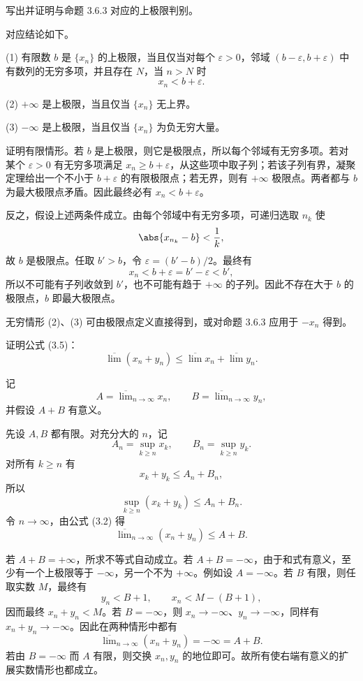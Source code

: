 \begin{xexercise}[3.6.4 练习题 9]
写出并证明与命题 3.6.3 对应的上极限判别。
\end{xexercise}
\begin{xsolution}
对应结论如下。

(1) 有限数 $b$ 是 $\{x_n\}$ 的上极限，当且仅当对每个 $\varepsilon>0$，邻域 $(b-\varepsilon,b+\varepsilon)$ 中有数列的无穷多项，并且存在 $N$，当 $n>N$ 时
\[
  x_n<b+\varepsilon.
\]

(2) $+\infty$ 是上极限，当且仅当 $\{x_n\}$ 无上界。

(3) $-\infty$ 是上极限，当且仅当 $\{x_n\}$ 为负无穷大量。

证明有限情形。若 $b$ 是上极限，则它是极限点，所以每个邻域有无穷多项。若对某个 $\varepsilon>0$ 有无穷多项满足 $x_n\geqslant b+\varepsilon$，从这些项中取子列；若该子列有界，凝聚定理给出一个不小于 $b+\varepsilon$ 的有限极限点；若无界，则有 $+\infty$ 极限点。两者都与 $b$ 为最大极限点矛盾。因此最终必有 $x_n<b+\varepsilon$。

反之，假设上述两条件成立。由每个邻域中有无穷多项，可递归选取 $n_k$ 使
\[
  \abs{x_{n_k}-b}<\frac1k,
\]
故 $b$ 是极限点。任取 $b'>b$，令 $\varepsilon=(b'-b)/2$。最终有
\[
  x_n<b+\varepsilon=b'-\varepsilon<b',
\]
所以不可能有子列收敛到 $b'$，也不可能有趋于 $+\infty$ 的子列。因此不存在大于 $b$ 的极限点，$b$ 即最大极限点。

无穷情形 (2)、(3) 可由极限点定义直接得到，或对命题 3.6.3 应用于 $-x_n$ 得到。
\end{xsolution}

\begin{xexercise}[3.6.4 练习题 10]
证明公式 (3.5)：
\[
  \overline{\lim}(x_n+y_n)
  \leqslant\overline{\lim}x_n+\overline{\lim}y_n.
\]
\end{xexercise}
\begin{xsolution}
记
\[
  A=\overline{\lim}_{n\to\infty}x_n,
  \qquad
  B=\overline{\lim}_{n\to\infty}y_n,
\]
并假设 $A+B$ 有意义。

先设 $A,B$ 都有限。对充分大的 $n$，记
\[
  A_n=\sup_{k\geqslant n}x_k,
  \qquad
  B_n=\sup_{k\geqslant n}y_k.
\]
对所有 $k\geqslant n$ 有
\[
  x_k+y_k\leqslant A_n+B_n,
\]
所以
\[
  \sup_{k\geqslant n}(x_k+y_k)\leqslant A_n+B_n.
\]
令 $n\to\infty$，由公式 (3.2) 得
\[
  \overline{\lim}_{n\to\infty}(x_n+y_n)
  \leqslant A+B.
\]

若 $A+B=+\infty$，所求不等式自动成立。若 $A+B=-\infty$，由于和式有意义，至少有一个上极限等于 $-\infty$，另一个不为 $+\infty$。例如设 $A=-\infty$。若 $B$ 有限，则任取实数 $M$，最终有
\[
  y_n<B+1,
  \qquad
  x_n<M-(B+1),
\]
因而最终 $x_n+y_n<M$。若 $B=-\infty$，则 $x_n\to-\infty$、$y_n\to-\infty$，同样有 $x_n+y_n\to-\infty$。因此在两种情形中都有
\[
  \overline{\lim}_{n\to\infty}(x_n+y_n)=-\infty=A+B.
\]
若由 $B=-\infty$ 而 $A$ 有限，则交换 $x_n,y_n$ 的地位即可。故所有使右端有意义的扩展实数情形也都成立。
\end{xsolution}

